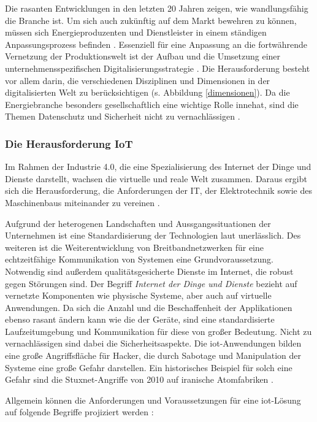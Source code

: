 \noindent Die rasanten Entwicklungen in den letzten 20 Jahren zeigen, wie wandlungsfähig die Branche ist. Um sich auch zukünftig auf dem Markt bewehren zu können, müssen sich Energieproduzenten und Dienstleister in einem ständigen Anpassungsprozess befinden \citep{Doleski2015}. Essenziell für eine Anpassung an die fortwährende Vernetzung der Produktionswelt ist der Aufbau und die Umsetzung einer unternehmensspezifischen Digitalisierungsstrategie \citep{Koester2017}. Die Herausforderung besteht vor allem darin, die verschiedenen Disziplinen und Dimensionen in der digitalisierten Welt zu berücksichtigen (s. Abbildung \ref{dimensionen}).  Da die Energiebranche besonders gesellschaftlich eine wichtige Rolle innehat, sind die Themen Datenschutz und Sicherheit nicht zu vernachlässigen \citep{Utecht2018}.


\subsubsection{Die Herausforderung IoT}\label{general}

Im Rahmen der Industrie 4.0, die eine Spezialisierung des Internet der Dinge und Dienste darstellt, wachsen die virtuelle und reale Welt zusammen. Daraus ergibt sich die Herausforderung, die Anforderungen der IT, der Elektrotechnik sowie des Maschinenbaus miteinander zu vereinen \citep{Huebner2017}.

\noindent Aufgrund der heterogenen Landschaften und Aussgangssituationen der Unternehmen ist eine Standardisierung der Technologien laut \citet{Bauer2014} unerlässlich. Des weiteren ist die Weiterentwicklung von Breitbandnetzwerken für eine echtzeitfähige Kommunikation von Systemen eine Grundvoraussetzung. Notwendig sind außerdem qualitätsgesicherte Dienste im Internet, die robust gegen Störungen sind. Der Begriff \textit{Internet der Dinge und Dienste} bezieht auf vernetzte Komponenten wie physische Systeme, aber auch auf virtuelle Anwendungen. Da sich die Anzahl und die Beschaffenheit der Applikationen ebenso rasant ändern kann wie die der Geräte, sind eine standardisierte Laufzeitumgebung und Kommunikation für diese von großer Bedeutung. Nicht zu vernachlässigen sind dabei die Sicherheitsaspekte. Die \ac{iot}-Anwendungen bilden eine große Angriffsfläche für Hacker, die durch Sabotage und Manipulation der Systeme eine große Gefahr darstellen. Ein historisches Beispiel für solch eine Gefahr sind die Stuxnet-Angriffe von 2010 auf iranische Atomfabriken \citep{Bauer2014}.

\noindent Allgemein können die Anforderungen und Voraussetzungen für eine \ac{iot}-Lösung auf folgende Begriffe projiziert werden \citep{Acharya2019}:

